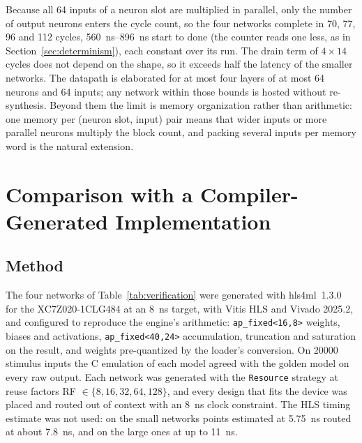 \documentclass[pdflatex,sn-mathphys-num,iicol]{sn-jnl}
\begin{document}
Because all 64 inputs of a neuron slot are multiplied in parallel, only the
number of output neurons enters the cycle count, so the four networks complete
in 70, 77, 96 and 112 cycles, \SIrange{560}{896}{\nano\second} start to done
(the counter reads one less, as in Section~\ref{sec:determinism}), each
constant over its run. The drain term of $4\times14$ cycles does not
depend on the shape, so it exceeds half the latency of the smaller networks.
The datapath is elaborated for at most four layers of at most 64 neurons and 64
inputs; any network within those bounds is hosted without re-synthesis. Beyond
them the limit is memory organization rather than arithmetic: one memory per
(neuron slot, input) pair means that wider inputs or more parallel neurons
multiply the block count, and packing several inputs per memory word is the
natural extension.

\section{Comparison with a Compiler-Generated Implementation}
\label{sec:hls4ml}
\subsection{Method}
The four networks of Table~\ref{tab:verification} were generated with
hls4ml~1.3.0~\cite{Schulte2026} for the XC7Z020-1CLG484 at an
\SI{8}{\nano\second} target, with Vitis HLS and Vivado 2025.2, and configured to
reproduce the engine's arithmetic: \texttt{ap\_fixed<16,8>} weights, biases and
activations, \texttt{ap\_fixed<40,24>} accumulation, truncation and saturation
on the result, and weights pre-quantized by the loader's conversion. On
\num{20000} stimulus inputs the C emulation of each model agreed with the golden
model on every raw output. Each network was generated with the
\texttt{Resource} strategy at reuse factors RF $\in\{8,16,32,64,128\}$, and every
design that fits the device was placed and routed out of context with an
\SI{8}{\nano\second} clock constraint. The HLS timing estimate was not used: on
the small networks points estimated at \SI{5.75}{\nano\second} routed at about
\SI{7.8}{\nano\second}, and on the large ones at up to \SI{11}{\nano\second}.
\end{document}
